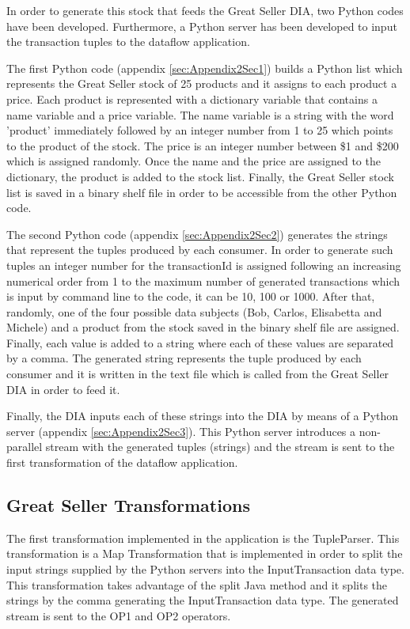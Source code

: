 In order to generate this stock that feeds the Great Seller DIA, two Python codes have been developed. Furthermore, a Python server has been developed to input the transaction tuples to the dataflow application.

The first Python code (appendix \ref{sec:Appendix2Sec1}) builds a Python list which represents the Great Seller stock of 25 products and it assigns to each product a price. Each product is represented with a dictionary variable that contains a name variable and a price variable. The name variable is a string with the word 'product' immediately followed by an integer number from 1 to 25 which points to the product of the stock. The price is an integer number between \$1 and \$200 which is assigned randomly. Once the name and the price are assigned to the dictionary, the product is added to the stock list. Finally, the Great Seller stock list is saved in a binary shelf file in order to be accessible from the other Python code.

The second Python code (appendix \ref{sec:Appendix2Sec2}) generates the strings that represent the tuples produced by each consumer. In order to generate such tuples an integer number for the transactionId is assigned following an increasing numerical order from 1 to the maximum number of generated transactions which is input by command line to the code, it can be 10, 100 or 1000. After that, randomly, one of the four possible data subjects (Bob, Carlos, Elisabetta and Michele) and a product from the stock saved in the binary shelf file are assigned. Finally, each value is added to a string where each of these values are separated by a comma. The generated string represents the tuple produced by each consumer and it is written in the text file which is called from the Great Seller DIA in order to feed it.

Finally, the DIA inputs each of these strings into the DIA by means of a Python server (appendix \ref{sec:Appendix2Sec3}). This Python server introduces a non-parallel stream with the generated tuples (strings) and the stream is sent to the first transformation of the dataflow application.

\subsection{Great Seller Transformations}

The first transformation implemented in the application is the TupleParser. This transformation is a Map Transformation that is implemented in order to split the input strings supplied by the Python servers into the InputTransaction data type. This transformation takes advantage of the split Java method and it splits the strings by the comma generating the InputTransaction data type. The generated stream is sent to the OP1 and OP2 operators.

